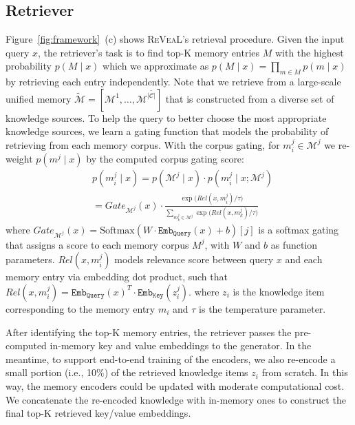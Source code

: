 \documentclass[10pt,twocolumn,letterpaper]{article}
\newcommand{\method}{R\textsc{e}V\textsc{ea}L\xspace}
\begin{document}
\subsection{Retriever} \label{sec:retrieval}
Figure~\ref{fig:framework}~(c) shows \method's retrieval procedure.
Given the input query $x$, the retriever's task is to find top-K memory entries $M$ with the highest probability $p(M \mid x)$ which we approximate as $p(M \mid x) = \prod_{m \in M} p(m \mid x)$ by retrieving each entry independently.
Note that we retrieve from a large-scale unified memory $\tilde{\mathcal{M}}=[\mathcal{M}^1, \dots, \mathcal{M}^{|\tilde{\mathcal{C}|}}]$ that is constructed from a diverse set of knowledge sources. To help the query to better choose the most appropriate knowledge sources, we learn a gating function that models the probability of retrieving from each memory corpus. With the corpus gating, for $m^j_i \in \mathcal{M}^j$ we re-weight $p(m^j \mid x)$ by the computed corpus gating score:
\begin{align}
    &p(m^j_i \mid x)= p(\mathcal{M}^j \mid x) \cdot p(m^j_i \mid x;\mathcal{M}^j)  \label{eq:prob} \\
    &= Gate_{\mathcal{M}^j}(x) \cdot \frac{\exp\big( Rel(x, m^j_i) / \tau \big) }{\sum_{m^{j}_{k} \in \mathcal{M}^j} \exp\big( Rel(x, m^{j}_{k}) / \tau \big)}   \label{eq:retrieve}
\end{align}
where $Gate_{\mathcal{M}^j}(x)=\text{Softmax}(W\cdot \texttt{Emb}_{\texttt{Query}}(x) + b)[j]$ is a softmax gating that assigns a score to each memory corpus $M^j$,
with $W$ and $b$ as function parameters. 
$Rel(x,m^j_i)$ models relevance score between query $x$ and each memory entry via embedding dot product, such that $Rel(x,m^j_i) = \texttt{Emb}_{\texttt{Query}}(x)^T \cdot \texttt{Emb}_{\texttt{Key}}(z^j_i)$. 
where $z_i$ is the knowledge item corresponding to the memory entry $m_i$ and $\tau$ is the temperature parameter.


After identifying the top-K memory entries, the retriever passes the pre-computed in-memory key and value embeddings to the generator. In the meantime, to support end-to-end training of the encoders, we also re-encode a small portion (i.e., 10$\%$) of the retrieved knowledge items $z_i$ from scratch. In this way, the memory encoders could be updated with moderate computational cost.
We concatenate the re-encoded knowledge with in-memory ones to construct the final top-K retrieved key/value embeddings.
\end{document}
